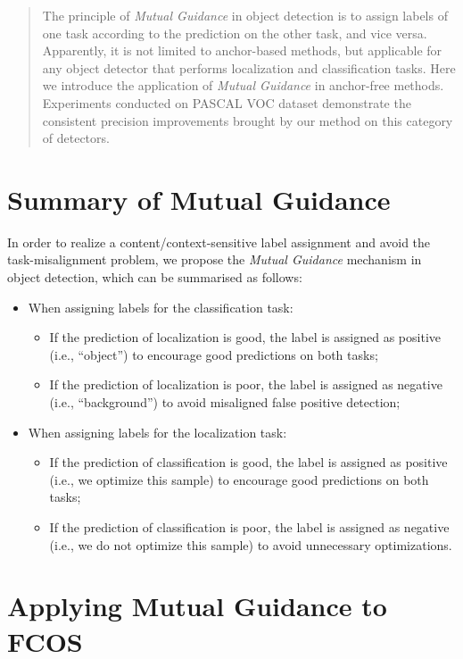\documentclass[runningheads]{llncs}
\begin{document}
\begin{abstract}
The principle of \emph{Mutual Guidance} in object detection is to assign labels of one task according to the prediction on the other task, and vice versa. Apparently, it is not limited to anchor-based methods, but applicable for any object detector that performs localization and classification tasks. Here we introduce the application of \emph{Mutual Guidance} in anchor-free methods. Experiments conducted on PASCAL VOC dataset demonstrate the consistent precision improvements brought by our method on this category of detectors.
\end{abstract}

\section{Summary of Mutual Guidance}

In order to realize a content/context-sensitive label assignment and avoid the task-misalignment problem, we propose the \emph{Mutual Guidance} mechanism in object detection, which can be summarised as follows:

\begin{itemize}
  \item When assigning labels for the classification task:
  \begin{itemize}
    \item If the prediction of localization is good, the label is assigned as positive (i.e., ``object'') to encourage good predictions on both tasks;
    \item If the prediction of localization is poor, the label is assigned as negative (i.e., ``background'') to avoid misaligned false positive detection;
  \end{itemize}
  \item When assigning labels for the localization task:
  \begin{itemize}
    \item If the prediction of classification is good, the label is assigned as positive (i.e., we optimize this sample) to encourage good predictions on both tasks;
    \item If the prediction of classification is poor, the label is assigned as negative (i.e., we do not optimize this sample) to avoid unnecessary optimizations.
  \end{itemize}
\end{itemize}

\section{Applying Mutual Guidance to FCOS}
\end{document}
